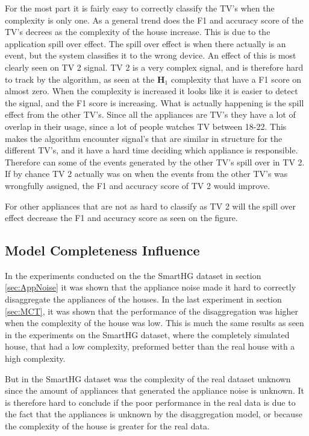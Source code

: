 For the most part it is fairly easy to correctly classify the TV's when the complexity is only one. As a general trend does the F1 and accuracy score of the TV's decrees as the complexity of the house increase. This is due to the application spill over effect. The spill over effect is when there actually is an event, but the system classifies it to the wrong device.  An effect of this is most clearly seen on TV 2 signal. TV 2 is a very complex signal, and is therefore hard to track by the algorithm, as seen at the $\textbf{H}_1$ complexity that have a F1 score on almost zero. When the complexity is increased it looks like it is easier to detect the signal, and the F1 score is increasing. What is actually happening is the spill effect from the other TV's. Since all the appliances are TV's they have a lot of overlap in their usage, since a lot of people watches TV between 18-22. This makes the algorithm encounter signal's that are similar in structure for the different TV's, and it have a hard time deciding which appliance is responsible. Therefore can some of the events generated by the other TV's spill over in TV 2. If by chance TV 2 actually was on when the events from the other TV's was wrongfully assigned, the F1 and accuracy score of TV 2 would improve. 

For other appliances that are not as hard to classify as TV 2 will the spill over effect decrease the F1 and accuracy score as seen on the figure. 

\subsection{Model Completeness Influence }
In the experiments conducted on the the SmartHG dataset in section \ref{sec:AppNoise} it was shown that the appliance noise made it hard to correctly disaggregate the appliances of the houses. In the last experiment in section \ref{sec:MCT}, it was shown that the performance of the disaggregation was higher when the complexity of the house was low. This is much the same results as seen in the experiments on the SmartHG dataset, where the completely simulated house, that had a low complexity, preformed better than the real house with a high complexity. 

But in the SmartHG dataset was the complexity of the real dataset unknown since the amount of appliances that generated the appliance noise is unknown. It is therefore hard to conclude if the poor performance in the real data is due to the fact that the appliances is unknown by the disaggregation model, or because the complexity of the house is greater for the real data. 


